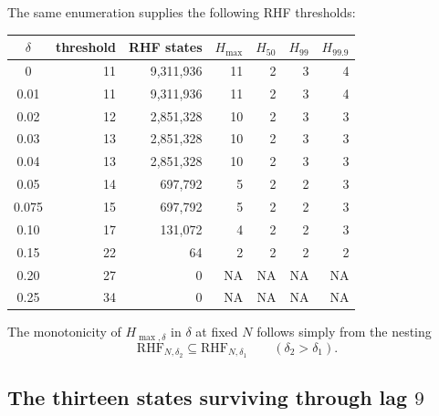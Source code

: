 \documentclass[11pt]{article}
\newcommand{\RHF}{\mathrm{RHF}}
\begin{document}
The same enumeration supplies the following RHF thresholds:
\begin{center}\small
\begin{tabular}{c r r r r r r}
\toprule $\delta$ & threshold & RHF states & $H_{\max}$ & $H_{50}$ & $H_{99}$ & $H_{99.9}$\\
\midrule
0 & 11 & 9{,}311{,}936 & 11 & 2 & 3 & 4\\
0.01 & 11 & 9{,}311{,}936 & 11 & 2 & 3 & 4\\
0.02 & 12 & 2{,}851{,}328 & 10 & 2 & 3 & 3\\
0.03 & 13 & 2{,}851{,}328 & 10 & 2 & 3 & 3\\
0.04 & 13 & 2{,}851{,}328 & 10 & 2 & 3 & 3\\
0.05 & 14 & 697{,}792 & 5 & 2 & 2 & 3\\
0.075 & 15 & 697{,}792 & 5 & 2 & 2 & 3\\
0.10 & 17 & 131{,}072 & 4 & 2 & 2 & 3\\
0.15 & 22 & 64 & 2 & 2 & 2 & 2\\
0.20 & 27 & 0 & NA & NA & NA & NA\\
0.25 & 34 & 0 & NA & NA & NA & NA\\
\bottomrule\end{tabular}
\end{center}

The monotonicity of $H_{\max,\delta}$ in $\delta$ at fixed $N$ follows simply from the nesting
\[
 \RHF_{N,\delta_2}\subseteq\RHF_{N,\delta_1}
 \qquad(\delta_2>\delta_1).
\]

\subsection{The thirteen states surviving through lag $9$}
\end{document}
